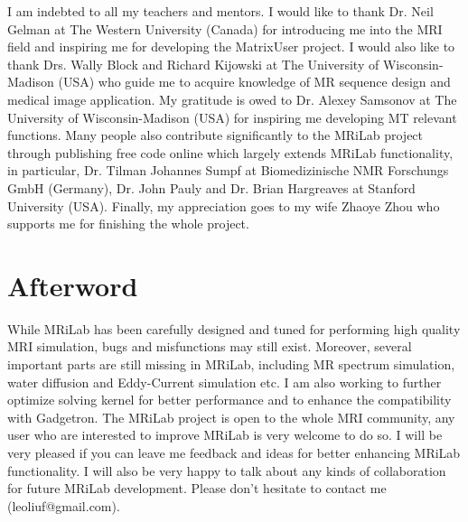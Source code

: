 \documentclass{book}%
\begin{document}
I am indebted to all my teachers and mentors. I would like to thank Dr. Neil Gelman at The Western University (Canada) for introducing me into the MRI field and inspiring me for developing the MatrixUser project. I would also like to thank Drs. Wally Block and Richard Kijowski at The University of Wisconsin-Madison (USA) who guide me to acquire knowledge of MR sequence design and medical image application. My gratitude is owed to Dr. Alexey Samsonov at The University of Wisconsin-Madison (USA) for inspiring me developing MT relevant functions. Many people also contribute significantly to the MRiLab project through publishing free code online which largely extends MRiLab functionality, in particular, Dr. Tilman Johannes Sumpf at Biomedizinische NMR Forschungs GmbH (Germany), Dr. John Pauly and Dr. Brian Hargreaves at Stanford University (USA). Finally, my appreciation goes to my wife Zhaoye Zhou who supports me for finishing the whole project.

\chapter{Afterword}

While MRiLab has been carefully designed and tuned for performing high quality MRI simulation, bugs and misfunctions may still exist. Moreover, several important parts are still missing in MRiLab, including MR spectrum simulation, water diffusion and Eddy-Current simulation etc. I am also working to further optimize solving kernel for better performance and to enhance the compatibility with Gadgetron. The MRiLab project is open to the whole MRI community, any user who are interested to improve MRiLab is very welcome to do so. I will be very pleased if you can leave me feedback and ideas for better enhancing MRiLab functionality. I will also be very happy to talk about any kinds of collaboration for future MRiLab development. Please don't hesitate to contact me (leoliuf@gmail.com).
\end{document}
